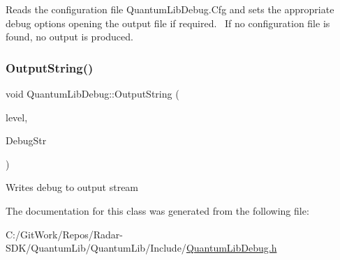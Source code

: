 Reads the configuration file Quantum\+Lib\+Debug.\+Cfg and sets the appropriate debug options opening the output file if required.~\newline
If no configuration file is found, no output is produced.~\newline
 \mbox{\label{class_quantum_lib_debug_a3baba026471b16a53e182ac61d1daa27}} 
\subsubsection{\texorpdfstring{Output\+String()}{OutputString()}}
{\footnotesize\ttfamily void Quantum\+Lib\+Debug\+::\+Output\+String (\begin{DoxyParamCaption}\item[{\mbox{\hyperlink{_quantum_lib_debug_8h_a2f13c7df267567b446dbccb2746149f3}{e\+Debug\+Level\+\_\+t}}}]{level,  }\item[{char $\ast$}]{Debug\+Str }\end{DoxyParamCaption})}

Writes debug to output stream 

The documentation for this class was generated from the following file\+:\begin{DoxyCompactItemize}
\item 
C\+:/\+Git\+Work/\+Repos/\+Radar-\/\+S\+D\+K/\+Quantum\+Lib/\+Quantum\+Lib/\+Include/\mbox{\hyperlink{_quantum_lib_debug_8h}{Quantum\+Lib\+Debug.\+h}}\end{DoxyCompactItemize}
